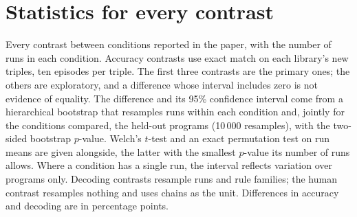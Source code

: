 \documentclass[11pt]{article}
\begin{document}
\begin{table}[h]\centering\small
{}
\caption{Mantel correlations between the code's rule-similarity matrices and human description
similarity. Partial correlations controlling for difficulty differ by $< 0.01$.}\label{tab:larc2}
\end{table}




\section{Statistics for every contrast}\label{s:stats}
Every contrast between conditions reported in the paper, with the number of runs in each condition. Accuracy
contrasts use exact match on each library's new triples, ten episodes per triple. The first three contrasts are
the primary ones; the others are exploratory, and a difference whose interval includes zero is not evidence of
equality. The difference
and its 95\% confidence interval come from a hierarchical bootstrap that resamples runs within each condition
and, jointly for the conditions compared, the held-out programs (10\,000 resamples), with the two-sided bootstrap
$p$-value. Welch's $t$-test and an exact permutation test on run means are given alongside, the latter with the
smallest $p$-value its number of runs allows. Where a condition has a single run, the interval reflects
variation over programs only. Decoding contrasts resample runs and rule families; the human contrast resamples
nothing and uses chains as the unit. Differences in accuracy and decoding are in percentage points.
\end{document}
